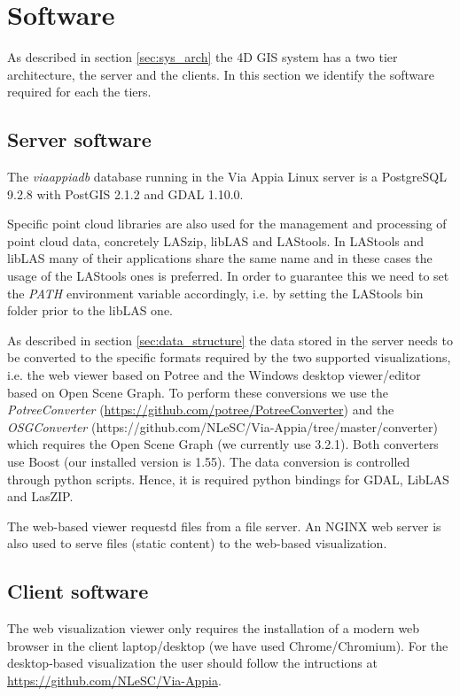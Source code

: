 \section{Software}
\label{sec:software}
As described in section \ref{sec:sys_arch} the 4D GIS system has a two tier
architecture, the server and the clients. In this section we identify the software
required for each the tiers.

\subsection{Server software}
The \textit{viaappiadb} database running in the Via Appia Linux server is a
PostgreSQL 9.2.8 with PostGIS 2.1.2 and GDAL 1.10.0.

Specific point cloud libraries are also used for the management and processing
of point cloud data, concretely LASzip, libLAS and LAStools. In LAStools and
libLAS many of their applications share the same name and in these cases the
usage of the LAStools ones is preferred. In order to guarantee this we need to
set the \textit{PATH} environment variable accordingly, i.e. by setting the
LAStools bin folder prior to the libLAS one.

As described in section \ref{sec:data_structure} the data stored in the server
needs to be converted to the specific formats required by the two supported
visualizations, i.e. the web viewer based on Potree and the Windows desktop
viewer/editor based on Open Scene Graph. To perform these conversions we use
the \textit{PotreeConverter} ({\url{https://github.com/potree/PotreeConverter}}) and
the \textit{OSGConverter}
(https://github.com/NLeSC/Via-Appia/tree/master/converter) which requires the
Open Scene Graph (we currently use 3.2.1). Both converters use Boost (our
installed version is 1.55). The data conversion is controlled through python
scripts. Hence, it is required python bindings for GDAL, LibLAS and LasZIP. 

The web-based viewer requestd files from a file server. An NGINX web server is
also used to serve files (static content) to the web-based visualization.

\subsection{Client software}
The web visualization viewer only requires the installation of a modern web
browser in the client laptop/desktop (we have used Chrome/Chromium). For the
desktop-based visualization the user should follow the intructions
at {\url{https://github.com/NLeSC/Via-Appia}}.

